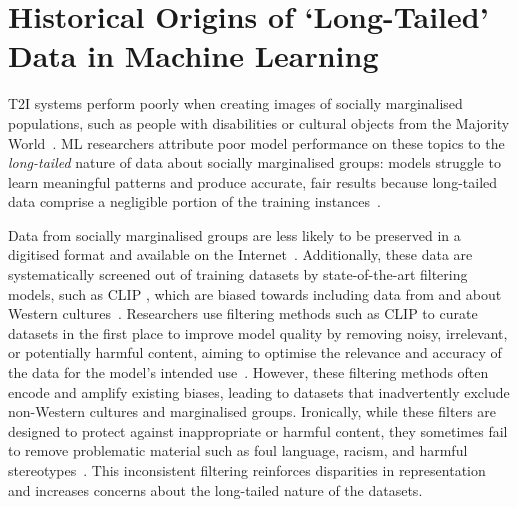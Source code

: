 \section{Historical Origins of `Long-Tailed' Data in Machine Learning}\label{background}

T2I systems perform poorly when creating images of socially marginalised populations, such as people with disabilities or cultural objects from the Majority World~\cite{qadri2024,dasProvenanceAberrationsImage2024,mack2024they}. ML researchers attribute poor model performance on these topics to the \textit{long-tailed} nature of data about socially marginalised groups: models struggle to learn meaningful patterns and produce accurate, fair results because long-tailed data comprise a negligible portion of the training instances~\cite{zhang2023deeplongtailed, massiceti2021orbit}. 

Data from socially marginalised groups are less likely to be preserved in a digitised format and available on the Internet~\cite{Noble+2018}. Additionally, these data are systematically screened out of training datasets by state-of-the-art filtering models, such as CLIP \cite{radford2021learning}, which are biased towards including data from and about Western cultures~\cite{hong2024s}. Researchers use filtering methods such as CLIP to curate datasets in the first place to improve model quality by removing noisy, irrelevant, or potentially harmful content, aiming to optimise the relevance and accuracy of the data for the model’s intended use~\cite{fang2023data}. However, these filtering methods often encode and amplify existing biases, leading to datasets that inadvertently exclude non-Western cultures and marginalised groups. Ironically, while these filters are designed to protect against inappropriate or harmful content, they sometimes fail to remove problematic material such as foul language, racism, and harmful stereotypes~\cite{birhane2021misogyny}. This inconsistent filtering reinforces disparities in representation and increases concerns about the long-tailed nature of the datasets.

